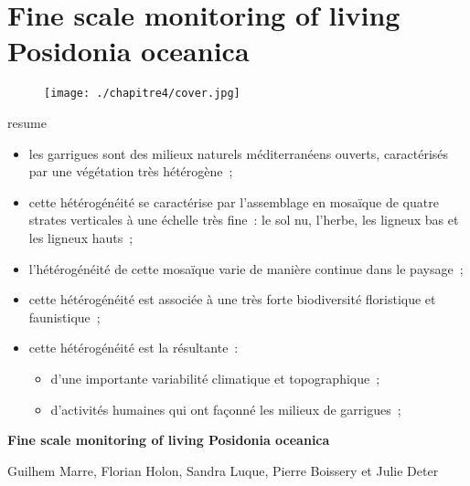 \chapter{Fine scale monitoring of living Posidonia oceanica} \label{chapitre4-structure}

\pagestyle{main}
\begin{figure}[H] 
	\begin{center}
	\texttt{[image: ./chapitre4/cover.jpg]}
    \end{center}
\end{figure}

\begin{colbox}{resume}
  \vspace{-2pt}
{\color{textresume}\small
\begin{itemize}[leftmargin=0in]\itemsep3pt
\item les garrigues sont des milieux naturels méditerranéens ouverts, caractérisés par une végétation très hétérogène~;
\item cette hétérogénéité se caractérise par l'assemblage en mosaïque de quatre strates verticales à une échelle très fine~: le sol nu, l'herbe, les ligneux bas et les ligneux hauts~;
\item l'hétérogénéité de cette mosaïque varie de manière continue dans le paysage~;
\item cette hétérogénéité est associée à une très forte biodiversité floristique et faunistique~;
\item cette hétérogénéité est la résultante~:
\begin{itemize}
  \item d'une importante variabilité climatique et topographique~;
  \item d'activités humaines qui ont façonné les milieux de garrigues~;
\end{itemize}
\end{itemize}
}
\vspace{-2pt}
\end{colbox}

\clearpage

\noindent\textbf{Fine scale monitoring of living Posidonia oceanica}

\noindent Guilhem Marre, Florian Holon, Sandra Luque, Pierre Boissery et Julie Deter

